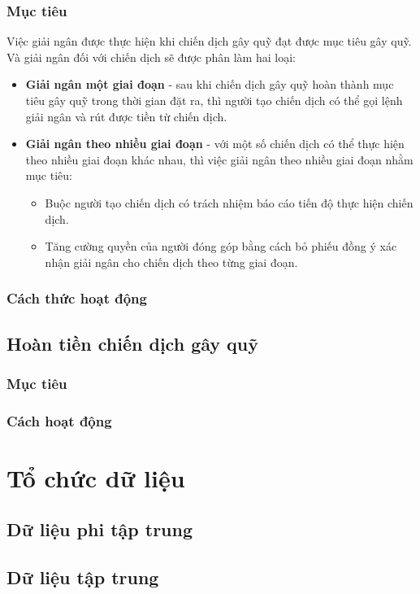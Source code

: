 \documentclass[../main-report.tex]{subfiles}
\begin{document}
\subsubsection{Mục tiêu}
Việc giải ngân được thực hiện khi chiến dịch gây quỹ đạt được mục tiêu gây quỹ. Và giải ngân đối với chiến dịch sẽ được phân làm hai loại:

\begin{itemize}
\item \textbf{Giải ngân một giai đoạn} - sau khi chiến dịch gây quỹ hoàn thành mục tiêu gây quỹ trong thời gian đặt ra, thì người tạo chiến dịch có thể gọi lệnh giải ngân và rút được tiền từ chiến dịch.
\item \textbf{Giải ngân theo nhiều giai đoạn} - với một số chiến dịch có thể thực hiện theo nhiều giai đoạn khác nhau, thì việc giải ngân theo nhiều giai đoạn nhằm mục tiêu:
\begin{itemize}
\item Buộc người tạo chiến dịch có trách nhiệm báo cáo tiến độ thực hiện chiến dịch.
\item Tăng cường quyền của người đóng góp bằng cách bỏ phiếu đồng ý xác nhận giải ngân cho chiến dịch theo từng giai đoạn.
\end{itemize}
\end{itemize}

\subsubsection{Cách thức hoạt động}

\subsection{Hoàn tiền chiến dịch gây quỹ}
\subsubsection{Mục tiêu}

\subsubsection{Cách hoạt động}

\section{Tổ chức dữ liệu}
\subsection{Dữ liệu phi tập trung}

\subsection{Dữ liệu tập trung}
\end{document}

